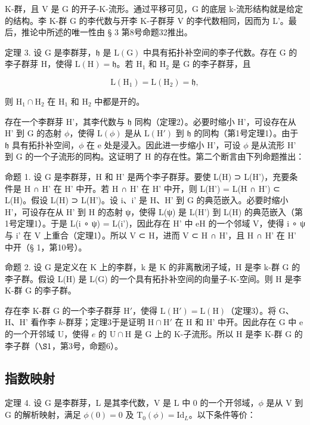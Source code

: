 K-群，且 V 是 G 的开子-K-流形。通过平移可见，G 的底层 k-流形结构就是给定的结构。李 K-群 G 的李代数与开李 K-子群芽 V 的李代数相同，因而为 L'。最后，推论中所述的唯一性由 § 3 第8号命题32推出。

定理 3. 设 G 是李群芽，\(\mathfrak{h}\) 是 \(\mathrm{L}(\mathrm{G})\) 中具有拓扑补空间的李子代数。存在 G 的李子群芽 H，使得 \(\mathrm{L}(\mathrm{H}) = \mathfrak{h}\)。若 \(\mathrm{H}_1\) 和 \(\mathrm{H}_2\) 是 G 的李子群芽，且

\[
\mathrm{L} (\mathrm{H} _ {1}) = \mathrm{L} (\mathrm{H} _ {2}) = \mathfrak {h},
\]

则 \(\mathrm{H}_1\cap \mathrm{H}_2\) 在 \(\mathrm{H}_1\) 和 \(\mathrm{H}_2\) 中都是开的。

存在一个李群芽 H'，其李代数与 \(\mathfrak{h}\) 同构（定理2）。必要时缩小 H'，可设存在从 H' 到 G 的态射 \(\phi\)，使得 \(\mathrm{L}(\phi)\) 是从 \(\mathrm{L}(\mathrm{H}')\) 到 \(\mathfrak{h}\) 的同构（第1号定理1）。由于 \(\mathfrak{h}\) 具有拓扑补空间，\(\phi\) 在 e 处是浸入。因此进一步缩小 H'，可设 \(\phi\) 是从流形 H' 到 G 的一个子流形的同构。这证明了 H 的存在性。第二个断言由下列命题推出：

命题 1. 设 G 是李群芽，H 和 H' 是两个李子群芽。要使 L(H) ⊃ L(H')，充要条件是 H ∩ H' 在 H' 中开。若 H ∩ H' 在 H' 中开，则 L(H') = L(H ∩ H') ⊂ L(H)。假设 L(H) ⊃ L(H')。设 i、i' 是 H、H' 到 G 的典范嵌入。必要时缩小 H'，可设存在从 H' 到 H 的态射 ψ，使得 L(ψ) 是 L(H') 到 L(H) 的典范嵌入（第1号定理1）。于是 L(i ∘ ψ) = L(i')，因此存在 H' 中 eH 的一个邻域 V，使得 i ∘ ψ 与 i' 在 V 上重合（定理1）。所以 V ⊂ H，进而 V ⊂ H ∩ H'，且 H ∩ H' 在 H' 中开（§ 1，第10号）。

命题 2. 设 G 是定义在 K 上的李群，k 是 K 的非离散闭子域，H 是李 k-群 G 的李子群。假设 L(H) 是 L(G) 的一个具有拓扑补空间的向量子-K-空间。则 H 是李 K-群 G 的李子群。

存在李 K-群 G 的一个李子群芽 \(\mathrm{H}'\)，使得 \(\mathrm{L}(\mathrm{H}') = \mathrm{L}(\mathrm{H})\)（定理3）。将 G、H、H' 看作李 \(k\)-群芽；定理3于是证明 \(\mathrm{H} \cap \mathrm{H}'\) 在 H 和 H' 中开。因此存在 G 中 e 的一个开邻域 U，使得 \(e\) 的 \(\mathrm{U} \cap \mathrm{H}\) 是 G 上的 K-子流形。所以 H 是李 K-群 G 的李子群（\(\S 1\)，第3号，命题6）。

\subsection{指数映射}

定理 4. 设 G 是李群芽，L 是其李代数，V 是 L 中 0 的一个开邻域，\(\phi\) 是从 V 到 G 的解析映射，满足 \(\phi(0) = 0\) 及 \(\mathrm{T}_0(\phi) = \mathrm{Id}_L\)。以下条件等价：

